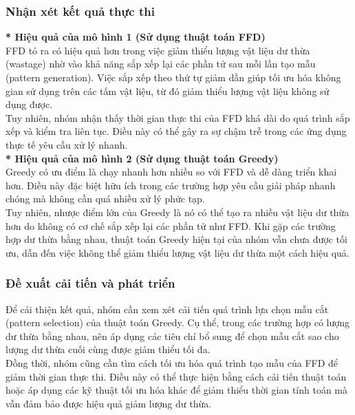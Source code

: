\documentclass[a4paper]{article}
\begin{document}
\subsubsection{Nhận xét kết quả thực thi}
\indent\indent \textbf{* Hiệu quả của mô hình 1 (Sử dụng thuật toán FFD)} \\
\indent FFD tỏ ra có hiệu quả hơn trong việc giảm thiểu lượng vật liệu dư thừa (wastage) nhờ vào khả năng sắp xếp lại các phần tử sau mỗi lần tạo mẫu (pattern generation). Việc sắp xếp theo thứ tự giảm dần giúp tối ưu hóa không gian sử dụng trên các tấm vật liệu, từ đó giảm thiểu lượng vật liệu không sử dụng được. \\
\indent Tuy nhiên, nhóm nhận thấy thời gian thực thi của FFD khá dài do quá trình sắp xếp và kiểm tra liên tục. Điều này có thể gây ra sự chậm trễ trong các ứng dụng thực tế yêu cầu xử lý nhanh. \\
\indent \textbf{* Hiệu quả của mô hình 2 (Sử dụng thuật toán Greedy)} \\
\indent Greedy có ưu điểm là chạy nhanh hơn nhiều so với FFD và dễ dàng triển khai hơn. Điều này đặc biệt hữu ích trong các trường hợp yêu cầu giải pháp nhanh chóng mà không cần quá nhiều xử lý phức tạp.
\\
\indent Tuy nhiên, nhược điểm lớn của Greedy là nó có thể tạo ra nhiều vật liệu dư thừa hơn do không có cơ chế sắp xếp lại các phần tử như FFD. Khi gặp các trường hợp dư thừa bằng nhau, thuật toán Greedy hiện tại của nhóm vẫn chưa được tối ưu, dẫn đến việc không thể giảm thiểu lượng vật liệu dư thừa một cách hiệu quả.
\subsubsection{Đề xuất cải tiến và phát triển}
\indent\indent
Để cải thiện kết quả, nhóm cần xem xét cải tiến quá trình lựa chọn mẫu cắt (pattern selection) của thuật toán Greedy. Cụ thể, trong các trường hợp có lượng dư thừa bằng nhau, nên áp dụng các tiêu chí bổ sung để chọn mẫu cắt sao cho lượng dư thừa cuối cùng được giảm thiểu tối đa.
\\
\indent
Đồng thời, nhóm cũng cần tìm cách tối ưu hóa quá trình tạo mẫu của FFD để giảm thời gian thực thi. Điều này có thể thực hiện bằng cách cải tiến thuật toán hoặc áp dụng các kỹ thuật tối ưu hóa khác để giảm thiểu thời gian tính toán mà vẫn đảm bảo được hiệu quả giảm lượng dư thừa.


\newpage
\end{document}
